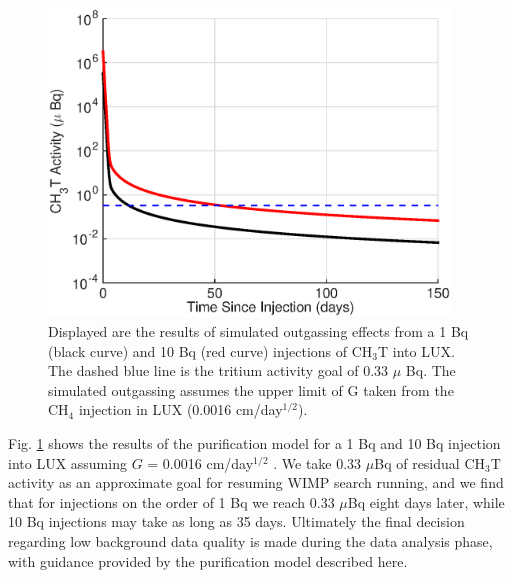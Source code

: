 \begin{figure}[h!]
\centering
\includegraphics[width=0.95\textwidth]{fig/LUX_og_lim.eps}
\caption{Displayed are the results of simulated outgassing effects from a 1 Bq (black curve) and 10 Bq (red curve) injections of CH$_3$T into LUX. The dashed blue line is the tritium activity goal of 0.33 $\mu$ Bq. The simulated outgassing assumes the upper limit of G taken from the CH$_4$ injection in LUX (0.0016 cm/day$^{1/2}$).}
\label{fig:tau_var}
\end{figure}

Fig. \ref{fig:tau_var} shows the results of the purification model for a 1 Bq and 10 Bq injection into LUX assuming $G$ = 0.0016 cm/day$^{1/2}$  . We take 0.33 $\mu$Bq of residual CH$_3$T activity as an approximate goal for resuming WIMP search running, and we find that for injections on the order of 1 Bq we reach 0.33 $\mu$Bq eight days later, while 10 Bq injections may take as long as 35 days.  Ultimately the final decision regarding low background data quality is made during the data analysis phase, with guidance provided by the purification model described here.
